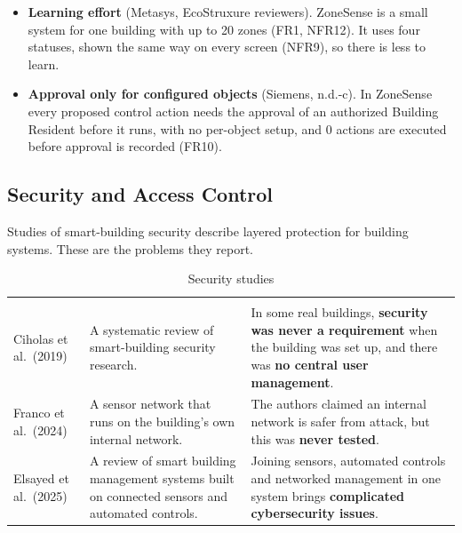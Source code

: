 \documentclass[11pt,a4paper]{article}
\begin{document}
\begin{itemize}
\item \textbf{Learning effort} (Metasys, EcoStruxure reviewers). ZoneSense is a small system for one building with up to 20 zones (FR1, NFR12). It uses four statuses, shown the same way on every screen (NFR9), so there is less to learn.
\item \textbf{Approval only for configured objects} (Siemens, n.d.-c). In ZoneSense every proposed control action needs the approval of an authorized Building Resident before it runs, with no per-object setup, and 0 actions are executed before approval is recorded (FR10).
\end{itemize}

\subsection{Security and Access Control}
Studies of smart-building security describe layered protection for building systems. These are the problems they report.

{\small\stripe
\begin{xltabular}{\linewidth}{|L{3.2cm}|L{5.4cm}|Y|}
\caption{Security studies}\label{tab:security}\\
\hline\headrow
{} &  & \\\hline
\endfirsthead
\hline\headrow
{} &  & \\\hline
\endhead
Ciholas et al.\ (2019) & A systematic review of smart-building security research. & In some real buildings, \textbf{security was never a requirement} when the building was set up, and there was \textbf{no central user management}.\\\hline
Franco et al.\ (2024) & A sensor network that runs on the building's own internal network. & The authors claimed an internal network is safer from attack, but this was \textbf{never tested}.\\\hline
Elsayed et al.\ (2025) & A review of smart building management systems built on connected sensors and automated controls. & Joining sensors, automated controls and networked management in one system brings \textbf{complicated cybersecurity issues}.\\\hline
\end{xltabular}}
\end{document}
